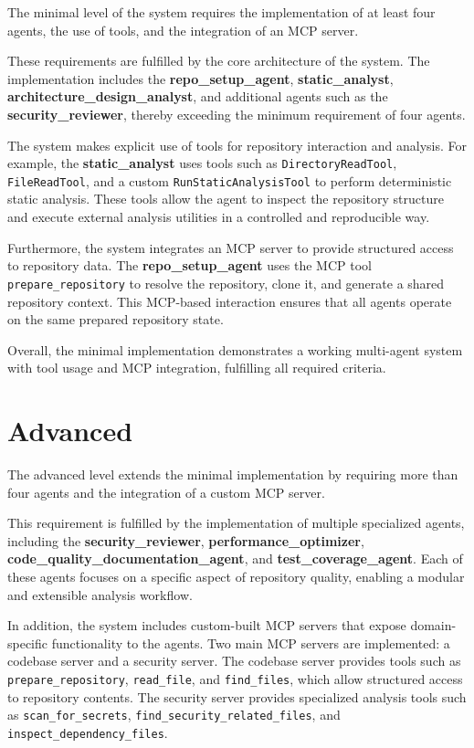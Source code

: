 \documentclass[conference]{IEEEtran}
\begin{document}
The minimal level of the system requires the implementation of at least four agents, the use of tools, and the integration of an MCP server.

These requirements are fulfilled by the core architecture of the system. The implementation includes the \textbf{repo\_setup\_agent}, \textbf{static\_analyst}, \textbf{architecture\_design\_analyst}, and additional agents such as the \textbf{security\_reviewer}, thereby exceeding the minimum requirement of four agents.

The system makes explicit use of tools for repository interaction and analysis. For example, the \textbf{static\_analyst} uses tools such as \texttt{DirectoryReadTool}, \texttt{FileReadTool}, and a custom \texttt{RunStaticAnalysisTool} to perform deterministic static analysis. These tools allow the agent to inspect the repository structure and execute external analysis utilities in a controlled and reproducible way.

Furthermore, the system integrates an MCP server to provide structured access to repository data. The \textbf{repo\_setup\_agent} uses the MCP tool \texttt{prepare\_repository} to resolve the repository, clone it, and generate a shared repository context. This MCP-based interaction ensures that all agents operate on the same prepared repository state.

Overall, the minimal implementation demonstrates a working multi-agent system with tool usage and MCP integration, fulfilling all required criteria.

\section{Advanced}

The advanced level extends the minimal implementation by requiring more than four agents and the integration of a custom MCP server.

This requirement is fulfilled by the implementation of multiple specialized agents, including the \textbf{security\_reviewer}, \textbf{performance\_optimizer}, \textbf{code\_quality\_documentation\_agent}, and \textbf{test\_coverage\_agent}. Each of these agents focuses on a specific aspect of repository quality, enabling a modular and extensible analysis workflow.

In addition, the system includes custom-built MCP servers that expose domain-specific functionality to the agents. Two main MCP servers are implemented: a codebase server and a security server. The codebase server provides tools such as \texttt{prepare\_repository}, \texttt{read\_file}, and \texttt{find\_files}, which allow structured access to repository contents. The security server provides specialized analysis tools such as \texttt{scan\_for\_secrets}, \texttt{find\_security\_related\_files}, and \texttt{inspect\_dependency\_files}.
\end{document}
